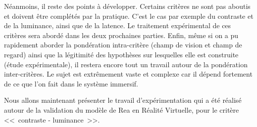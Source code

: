 \par Néanmoins, il reste des points à développer. Certains critères ne sont pas aboutis et doivent être complétés par la pratique. C'est le cas par exemple du contraste et de la luminance, ainsi que de la latence. Le traitement expérimental de ces critères sera abordé dans les deux prochaines parties. Enfin, même si on a pu rapidement aborder la pondération intra-critère (champ de vision et champ de regard) ainsi que la légitimité des hypothèses sur lesquelles elle est construite (étude expérimentale), il restera encore tout un travail autour de la pondération inter-critères. Le sujet est extrêmement vaste et complexe car il dépend fortement de ce que l'on fait dans le système immersif.

\par Nous allons maintenant présenter le travail d'expérimentation qui a été réalisé autour de la validation du modèle de Rea en Réalité Virtuelle, pour le critère <<~contraste - luminance~>>.